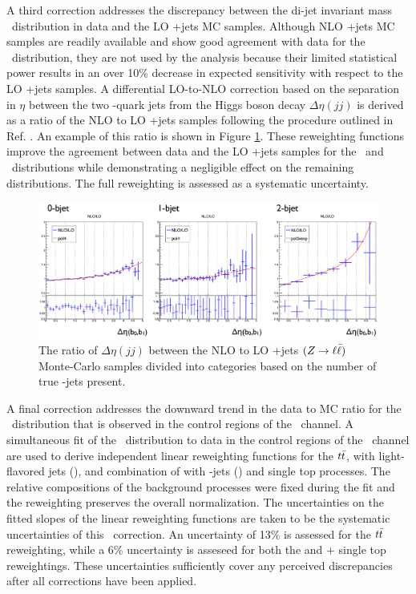 A third correction addresses the discrepancy between the di-jet invariant mass \mjj\ distribution in data and the LO \bosV+jets MC samples. Although NLO \bosV+jets MC samples are readily available and show good agreement with data for the \mjj\ distribution, they are not used by the analysis because their limited statistical power results in an over 10\% decrease in expected sensitivity with respect to the LO \bosV+jets samples. A differential LO-to-NLO correction based on the separation in $\eta$ between the two \qrkb-quark jets from the Higgs boson decay $\Delta\eta(jj)$ is derived as a ratio of the NLO to LO \bosV+jets samples following the procedure outlined in Ref. \cite{CMSVHbbEvidence}. An example of this ratio is shown in Figure \ref{fig:NLOtoLOratio}. These reweighting functions improve the agreement between data and the LO \bosV+jets samples for the \mjj\ and \pTV\ distributions while demonstrating a negligible effect on the remaining distributions. The full reweighting is assessed as a systematic uncertainty.

\begin{figure}[htbp]
  \centering
    \includegraphics[width=6in]{images/NLOtoLO}
    \caption[NLO to LO Ratio of $\Delta\eta(jj)$ for \bosZ+jets $(\bosZ \rightarrow \ell\bar{\ell})$ Samples]{The ratio of $\Delta\eta(jj)$ between the NLO to LO \bosZ+jets $(\bosZ \rightarrow \ell\bar{\ell})$ Monte-Carlo samples divided into categories based on the number of true \qrkb-jets present.}
    \label{fig:NLOtoLOratio}
\end{figure}

A final correction addresses the downward trend in the data to MC ratio for the \pTV\ distribution that is observed in the control regions of the \WlnH\ channel. A simultaneous fit of the \pTV\ distribution to data in the control regions of the \WlnH\ channel are used to derive independent linear reweighting functions for the $t\bar{t}$, \bosW with light-flavored jets (\Wlight), and combination of \bosW with \qrkb-jets (\Wbb) and single top processes. The relative compositions of the background processes were fixed during the fit and the reweighting preserves the overall normalization. The uncertainties on the fitted slopes of the linear reweighting functions are taken to be the systematic uncertainties of this \pTV\ correction. An uncertainty of 13\% is assessed for the $t\bar{t}$ reweighting, while a 6\% uncertainty is asseseed for both the \Wlight and \Wbb + single top reweightings. These uncertainties sufficiently cover any perceived discrepancies after all corrections have been applied.

